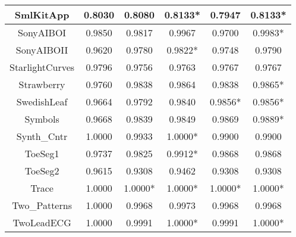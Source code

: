\documentclass[article]{IEEEtran}
\begin{document}
\begin{table}[]
\begin{adjustbox}{width=1 \linewidth}
\begin{tabularx}{0.62 \textwidth}{|C|C|C|C|C|C|}
    \hline
    SmlKitApp & 0.8030 & 0.8080 & 0.8133* & 0.7947 & 0.8133* \\
    \hline
    SonyAIBOI & 0.9850 & 0.9817 & 0.9967 & 0.9700 & 0.9983* \\
    \hline
    SonyAIBOII & 0.9620 & 0.9780 & 0.9822* & 0.9748 & 0.9790 \\
    \hline
    StarlightCurves & 0.9796 & 0.9756 & 0.9763 & 0.9767 & 0.9767 \\
    \hline
    Strawberry & 0.9760 & 0.9838 & 0.9864 & 0.9838 & 0.9865* \\
    \hline
    SwedishLeaf & 0.9664 & 0.9792 & 0.9840 & 0.9856* & 0.9856* \\
    \hline
    Symbols & 0.9668 & 0.9839 & 0.9849 & 0.9869 & 0.9889* \\
    \hline
    Synth\_Cntr & 1.0000 & 0.9933 & 1.0000* & 0.9900 & 0.9900 \\
    \hline
    ToeSeg1 & 0.9737 & 0.9825 & 0.9912* & 0.9868 & 0.9868 \\
    \hline
    ToeSeg2 & 0.9615 & 0.9308 & 0.9462 & 0.9308 & 0.9308 \\
    \hline
    Trace & 1.0000 & 1.0000* & 1.0000* & 1.0000* & 1.0000* \\
    \hline
    Two\_Patterns & 1.0000 & 0.9968 & 0.9973 & 0.9968 & 0.9968 \\
    \hline
    TwoLeadECG & 1.0000 & 0.9991 & 1.0000* & 0.9991 & 1.0000* \\

\end{tabularx}
\end{adjustbox}
\end{table}
\end{document}
